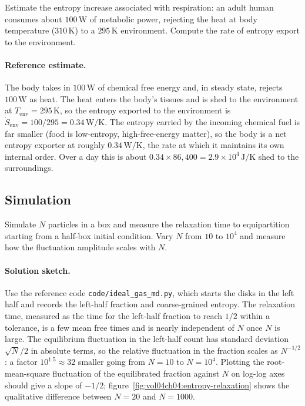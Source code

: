 \begin{exercise}
Estimate the entropy increase associated with respiration: an adult
human consumes about $100\,\text{W}$ of metabolic power, rejecting
the heat at body temperature ($310\,\si{\kelvin}$) to a $295\,\si{
\kelvin}$ environment. Compute the rate of entropy export to the
environment.

\paragraph{Reference estimate.} The body takes in $100\,\text{W}$ of
chemical free energy and, in steady state, rejects $100\,\text{W}$ as
heat. The heat enters the body's tissues and is shed to the environment
at $T_{\text{env}} = 295\,\si{\kelvin}$, so the entropy exported to the
environment is $\dot S_{\text{env}} = 100/295 =
0.34\,\text{W}/\si{\kelvin}$. The entropy carried by the incoming
chemical fuel is far smaller (food is low-entropy, high-free-energy
matter), so the body is a net entropy exporter at roughly
$0.34\,\text{W}/\si{\kelvin}$, the rate at which it maintains its own
internal order. Over a day this is about
$0.34 \times 86{,}400 = 2.9 \times 10^4\,\si{\joule\per\kelvin}$ shed to
the surroundings.
\end{exercise}

\subsection*{Simulation}

\begin{exercise}
Simulate $N$ particles in a box and measure the relaxation time to
equipartition starting from a half-box initial condition. Vary $N$
from $10$ to $10^4$ and measure how the fluctuation amplitude scales
with $N$.

\paragraph{Solution sketch.} Use the reference code
\texttt{code/ideal\_gas\_md.py}, which starts the disks in the left
half and records the left-half fraction and coarse-grained entropy. The
relaxation time, measured as the time for the left-half fraction to
reach $1/2$ within a tolerance, is a few mean free times and is nearly
independent of $N$ once $N$ is large. The equilibrium fluctuation in the
left-half count has standard deviation $\sqrt{N}/2$ in absolute terms,
so the relative fluctuation in the fraction scales as $N^{-1/2}$: a
factor $10^{1.5} \approx 32$ smaller going from $N = 10$ to $N = 10^4$.
Plotting the root-mean-square fluctuation of the equilibrated fraction
against $N$ on log-log axes should give a slope of $-1/2$;
figure~\ref{fig:vol04ch04:entropy-relaxation} shows the qualitative
difference between $N = 20$ and $N = 1000$.
\end{exercise}

